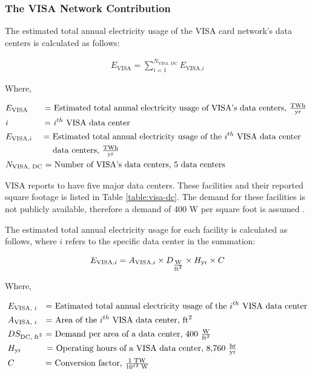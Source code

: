 \subsubsection{The VISA Network Contribution}\label{sec:visa-cn}
The estimated total annual electricity usage of the VISA card network's data centers is calculated as follows:

\begin{align}\label{eqn:visa-e}
  E_\textrm{VISA} = \sum\limits_{i=1}^{N_\textrm{VISA, DC}}  E_{\textrm{VISA,}i}
\end{align}

\noindent
Where,

\begin{align*}
  &E_\textrm{VISA} \textrm{ \ \ \quad = Estimated total annual electricity usage of VISA's data centers, $\tfrac{ \textrm{{T}Wh} } { \textrm{yr} }$ } \\
  &i \textrm{ \qquad \quad \quad = $i^{th}$ VISA data center} \\
  &E_{\textrm{VISA,} i} \textrm{ \quad = Estimated total annual electricity usage of the $i^{th}$ VISA data center} \\
  &\textrm{ \qquad \qquad \quad \ data centers, $\tfrac{ \textrm{{T}Wh} } { \textrm{yr} }$} \\
  &N_\textrm{VISA, DC} \textrm{ = Number of VISA's data centers, 5 data centers}
\end{align*}

VISA reports to have five major data centers.
These facilities and their reported square footage is listed in Table \ref{table:visa-dc}.
The demand for these facilities is not publicly available, therefore a demand of 400 W per square foot is assumed \cite{dc-w-per-ft2}.

The estimated total annual electricity usage for each facility is calculated as follows, where $i$ refers to the specific data center in the summation:

\begin{align}\label{eqn:visa-e-facility}
  E_{\textrm{VISA,} i} = A_{\textrm{VISA,} i} \times D_{\tfrac{\textrm{W} } { \textrm{ft\textsuperscript{2}}}} \times H_\textrm{yr} \times C
\end{align}

\noindent
Where,

\begin{align*}
  &E_{\textrm{VISA, } i} \textrm{ \ \ = Estimated total annual electricity usage of the $i^{th}$ VISA data center} \\
  &A_{\textrm{VISA, } i} \textrm{ \ \ = Area of the $i^{th}$ VISA data center, ft$^2$ } \\
  &DS_\textrm{DC, ft$^2$} \textrm{ = Demand per area of a data center, 400 $\tfrac{\textrm{W}}{\textrm{ft}^2}$} \\
  &H_\textrm{yr}  \textrm{\qquad \quad= Operating hours of a VISA data center, 8,760 $\tfrac{ \textrm{hr} } { \textrm{yr} }$} \\
  &C              \textrm{\qquad \quad \ \ = Conversion factor, $\tfrac{1 \textrm{ TW} } { 10^{12} \textrm{ W}}$}
\end{align*}

